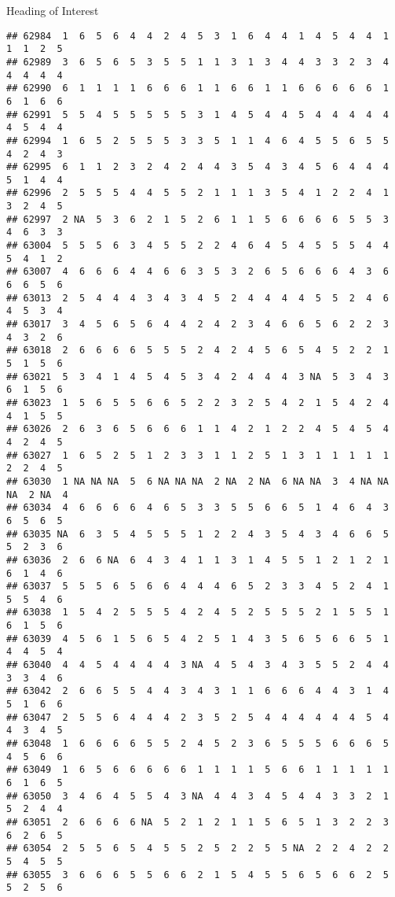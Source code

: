 \documentclass[
  ignorenonframetext,
]{beamer}
\begin{document}
\begin{frame}[fragile]{Heading of Interest}
\begin{verbatim}
## 62984  1  6  5  6  4  4  2  4  5  3  1  6  4  4  1  4  5  4  4  1  1  1  2  5
## 62989  3  6  5  6  5  3  5  5  1  1  3  1  3  4  4  3  3  2  3  4  4  4  4  4
## 62990  6  1  1  1  1  6  6  6  1  1  6  6  1  1  6  6  6  6  6  1  6  1  6  6
## 62991  5  5  4  5  5  5  5  5  3  1  4  5  4  4  5  4  4  4  4  4  4  5  4  4
## 62994  1  6  5  2  5  5  5  3  3  5  1  1  4  6  4  5  5  6  5  5  4  2  4  3
## 62995  6  1  1  2  3  2  4  2  4  4  3  5  4  3  4  5  6  4  4  4  5  1  4  4
## 62996  2  5  5  5  4  4  5  5  2  1  1  1  3  5  4  1  2  2  4  1  3  2  4  5
## 62997  2 NA  5  3  6  2  1  5  2  6  1  1  5  6  6  6  6  5  5  3  4  6  3  3
## 63004  5  5  5  6  3  4  5  5  2  2  4  6  4  5  4  5  5  5  4  4  5  4  1  2
## 63007  4  6  6  6  4  4  6  6  3  5  3  2  6  5  6  6  6  4  3  6  6  6  5  6
## 63013  2  5  4  4  4  3  4  3  4  5  2  4  4  4  4  5  5  2  4  6  4  5  3  4
## 63017  3  4  5  6  5  6  4  4  2  4  2  3  4  6  6  5  6  2  2  3  4  3  2  6
## 63018  2  6  6  6  6  5  5  5  2  4  2  4  5  6  5  4  5  2  2  1  5  1  5  6
## 63021  5  3  4  1  4  5  4  5  3  4  2  4  4  4  3 NA  5  3  4  3  6  1  5  6
## 63023  1  5  6  5  5  6  6  5  2  2  3  2  5  4  2  1  5  4  2  4  4  1  5  5
## 63026  2  6  3  6  5  6  6  6  1  1  4  2  1  2  2  4  5  4  5  4  4  2  4  5
## 63027  1  6  5  2  5  1  2  3  3  1  1  2  5  1  3  1  1  1  1  1  2  2  4  5
## 63030  1 NA NA NA  5  6 NA NA NA  2 NA  2 NA  6 NA NA  3  4 NA NA NA  2 NA  4
## 63034  4  6  6  6  6  4  6  5  3  3  5  5  6  6  5  1  4  6  4  3  6  5  6  5
## 63035 NA  6  3  5  4  5  5  5  1  2  2  4  3  5  4  3  4  6  6  5  5  2  3  6
## 63036  2  6  6 NA  6  4  3  4  1  1  3  1  4  5  5  1  2  1  2  1  6  1  4  6
## 63037  5  5  5  6  5  6  6  4  4  4  6  5  2  3  3  4  5  2  4  1  5  5  4  6
## 63038  1  5  4  2  5  5  5  4  2  4  5  2  5  5  5  2  1  5  5  1  6  1  5  6
## 63039  4  5  6  1  5  6  5  4  2  5  1  4  3  5  6  5  6  6  5  1  4  4  5  4
## 63040  4  4  5  4  4  4  4  3 NA  4  5  4  3  4  3  5  5  2  4  4  3  3  4  6
## 63042  2  6  6  5  5  4  4  3  4  3  1  1  6  6  6  4  4  3  1  4  5  1  6  6
## 63047  2  5  5  6  4  4  4  2  3  5  2  5  4  4  4  4  4  4  5  4  4  3  4  5
## 63048  1  6  6  6  6  5  5  2  4  5  2  3  6  5  5  5  6  6  6  5  4  5  6  6
## 63049  1  6  5  6  6  6  6  6  1  1  1  1  5  6  6  1  1  1  1  1  6  1  6  5
## 63050  3  4  6  4  5  5  4  3 NA  4  4  3  4  5  4  4  3  3  2  1  5  2  4  4
## 63051  2  6  6  6  6 NA  5  2  1  2  1  1  5  6  5  1  3  2  2  3  6  2  6  5
## 63054  2  5  5  6  5  4  5  5  2  5  2  2  5  5 NA  2  2  4  2  2  5  4  5  5
## 63055  3  6  6  6  5  5  6  6  2  1  5  4  5  5  6  5  6  6  2  5  5  2  5  6

\end{verbatim}
\end{frame}
\end{document}
